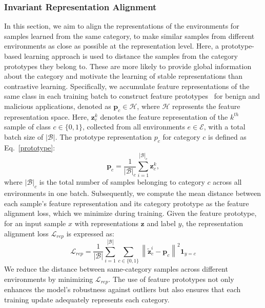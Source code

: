\subsubsection{Invariant Representation Alignment}
\label{representation_alignment}
In this section, we aim to align the representations of the environments for samples learned from the same category, to make similar samples from different environments as close as possible at the representation level. Here, a prototype-based learning approach is used to distance the samples from the category prototypes they belong to. These are more likely to provide global information about the category and motivate the learning of stable representations than contrastive learning. Specifically, we accumulate feature representations of the same class in each training batch to construct feature prototypes~\cite{prototype} for benign and malicious applications, denoted as $\mathbf{p}_c \in \mathcal{H}$, where $\mathcal{H}$ represents the feature representation space. Here, $\mathbf{z}^{k}_{c}$ denotes the feature representation of the $k^{th}$ sample of class $c \in \{0, 1\}$, collected from all environments $e \in \mathcal{E}$, with a total batch size of $|\mathcal{B}|$. The prototype representation $p_c$ for category $c$ is defined as Eq.~\ref{prototype}:
\begin{equation}
\label{prototype}
\mathbf{p}_c=\frac{1}{|\mathcal{B}|_c} \sum_{i=1}^{|\mathcal{B}|_c} \mathbf{z}^{k}_{c},
\end{equation}
where $|\mathcal{B}|_c$ is the total number of samples belonging to category $c$ across all environments in one batch. Subsequently, we compute the mean distance between each sample's feature representation and its category prototype as the feature alignment loss, which we minimize during training. Given the feature prototype, for an input sample $x$ with representations $\mathbf{z}$ and label $y$, the representation alignment loss $\mathcal{L}_{rep}$ is expressed as:
\begin{equation}
\mathcal{L}_{rep}=\frac{1}{|\mathcal{B}|} \sum_{i=1}^{|\mathcal{B}|} \sum_{c \in \{0, 1\}}\left\|\tilde{\mathbf{z}}^{i}_{c}-\mathbf{p}_c\right\|^2 \mathbf{1}_{y=c}
\end{equation}
We reduce the distance between same-category samples across different environments by minimizing $\mathcal{L}_{rep}$. The use of feature prototypes not only enhances the model's robustness against outliers but also ensures that each training update adequately represents each category.

